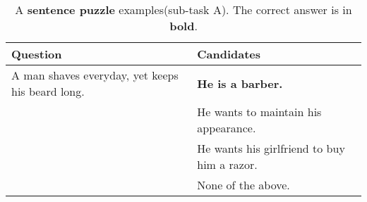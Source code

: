 \begin{table}
	\caption{A \textbf{sentence puzzle} examples(sub-task A). The correct answer is in \textbf{bold}.}
	\label{tab:sentence-puzzle-q}
	\begin{center}
		\begin{tabular}{|p{3.5cm}|p{3.5cm}|}
			\toprule
			Question                                         & Candidates                                  \\
			\midrule
			A man shaves everyday, yet keeps his beard long. & \textbf{He is a barber.}                    \\
			                                                 & He wants to maintain his appearance.        \\
			                                                 & He wants his girlfriend to buy him a razor. \\
			                                                 & None of the above.                           \\
			\bottomrule
		\end{tabular}
	\end{center}
\end{table}

